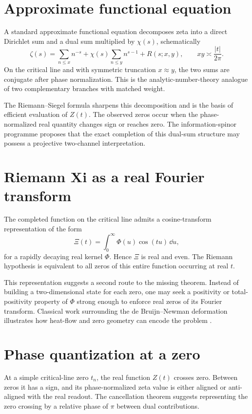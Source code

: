 \section{Approximate functional equation}
A standard approximate functional equation decomposes zeta into a direct Dirichlet sum and a dual sum multiplied by $\chi(s)$, schematically
\begin{equation}
\zeta(s)
=\sum_{n\leq x}n^{-s}
+\chi(s)\sum_{n\leq y}n^{s-1}
+R(s;x,y),
\qquad xy\asymp\frac{|t|}{2\pi}.
\label{eq:afe}
\end{equation}
On the critical line and with symmetric truncation $x\approx y$, the two sums are conjugate after phase normalization. This is the analytic-number-theory analogue of two complementary branches with matched weight.

The Riemann--Siegel formula sharpens this decomposition and is the basis of efficient evaluation of $Z(t)$. The observed zeros occur when the phase-normalized real quantity changes sign or reaches zero. The information-spinor programme proposes that the exact completion of this dual-sum structure may possess a projective two-channel interpretation.

\section{Riemann Xi as a real Fourier transform}
The completed function on the critical line admits a cosine-transform representation of the form
\begin{equation}
\Xi(t)=\int_0^\infty \Phi(u)\cos(tu)\,\dd u,
\label{eq:xi-fourier}
\end{equation}
for a rapidly decaying real kernel $\Phi$. Hence $\Xi$ is real and even. The Riemann hypothesis is equivalent to all zeros of this entire function occurring at real $t$.

This representation suggests a second route to the missing theorem. Instead of building a two-dimensional state for each zero, one may seek a positivity or total-positivity property of $\Phi$ strong enough to enforce real zeros of its Fourier transform. Classical work surrounding the de Bruijn--Newman deformation illustrates how heat-flow and zero geometry can encode the problem \cite{deBruijn1950,Newman1976,RodgersTao2020}.

\section{Phase quantization at a zero}
At a simple critical-line zero $t_n$, the real function $Z(t)$ crosses zero. Between zeros it has a sign, and its phase-normalized zeta value is either aligned or anti-aligned with the real readout. The cancellation theorem suggests representing the zero crossing by a relative phase of $\pi$ between dual contributions.

